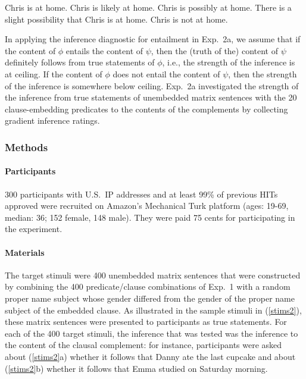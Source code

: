 \documentclass[11pt,fleqn]{article}
\newcommand{\6}{\mbox{$[\hspace*{-.6mm}[$}}
\newcommand{\9}{\mbox{$]\hspace*{-.6mm}]$}}
\begin{document}
\begin{exe}
\ex\label{chris}
\begin{xlist}
 Chris is at home.
 Chris is likely at home.
 Chris is possibly at home.
 There is a slight possibility that Chris is at home.
 Chris is not at home.
\end{xlist}
\end{exe}

In applying the inference diagnostic for entailment in Exp.~2a, we assume that if the content of $\phi$ entails the content of $\psi$, then the (truth of the) content of $\psi$ definitely follows from true statements of $\phi$, i.e., the strength of the inference is at ceiling. If the content of $\phi$ does not entail the content of $\psi$, then the strength of the inference is somewhere below ceiling. Exp.~2a investigated the strength of the inference from true statements of unembedded matrix sentences with the 20 clause-embedding predicates to the contents of the complements by collecting gradient inference ratings.

\subsubsection{Methods}

\paragraph{Participants} 300 participants with U.S.\ IP addresses and at least 99\% of previous HITs approved were recruited on Amazon's Mechanical Turk platform (ages: 19-69, median: 36; 152 female, 148 male). They were paid 75 cents for participating in the experiment.

\paragraph{Materials} The target stimuli were 400 unembedded matrix sentences that were constructed by combining the 400 predicate/clause combinations of Exp.~1 with a random proper name subject whose gender differed from the gender of the proper name subject of the embedded clause. As illustrated in the sample stimuli in (\ref{stims2}), these matrix sentences were presented to participants as true statements. For each of the 400 target stimuli, the inference that was tested was the inference to the content of the clausal complement: for instance, participants were asked about (\ref{stims2}a) whether it follows that Danny ate the last cupcake and about (\ref{stims2}b) whether it follows that Emma studied on Saturday morning.
\end{document}
